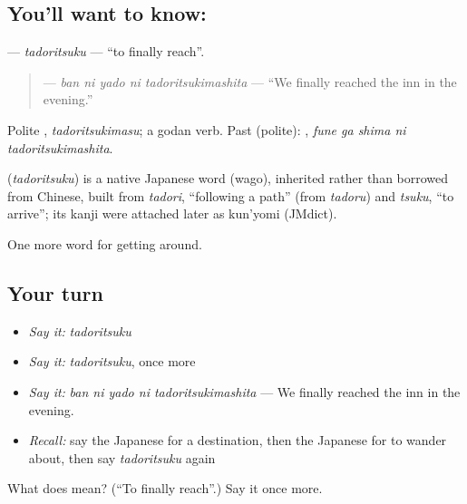 \subsection*{You'll want to know: }
\textbf{} — \emph{tadoritsuku} — \textquotedblleft{}to finally reach\textquotedblright{}.

\begin{quote}
\textbf{  } — \emph{ban ni yado ni tadoritsukimashita} — \textquotedblleft{}We finally reached the inn in the evening.\textquotedblright{}
\end{quote}

Polite \textbf{}, \emph{tadoritsukimasu}; a godan verb. Past (polite): \textbf{  }, \emph{fune ga shima ni tadoritsukimashita}.

\begin{cousinweb}
\textbf{} (\emph{tadoritsuku}) is a native Japanese word (wago), inherited rather than borrowed from Chinese, built from \emph{tadori}, \textquotedblleft{}following a path\textquotedblright{} (from \emph{tadoru}) and \emph{tsuku}, \textquotedblleft{}to arrive\textquotedblright{}; its kanji were attached later as kun'yomi (JMdict).
\end{cousinweb}

\begin{grammarlens}[title={What you've built}]
One more word for getting around.
\end{grammarlens}

\subsection*{Your turn}
\begin{itemize}
\raggedright
  \item \emph{Say it:} \emph{tadoritsuku}
  \item \emph{Say it:} \emph{tadoritsuku}, once more
  \item \emph{Say it:} \emph{ban ni yado ni tadoritsukimashita} — We finally reached the inn in the evening.
  \item \emph{Recall:} say the Japanese for a destination, then the Japanese for to wander about, then say \emph{tadoritsuku} again
\end{itemize}

\begin{tcolorbox}[breakable,colback=teal!4,colframe=teal!35!black,title={Before you move on}]
What does  mean? (\textquotedblleft{}To finally reach\textquotedblright{}.) Say it once more.
\end{tcolorbox}
